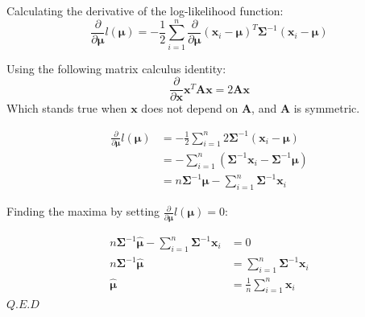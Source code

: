 \documentclass{homeworg}
\begin{document}
\bigskip
Calculating the derivative of the log-likelihood function:
\begin{equation}
    \frac{\partial}{\partial \bm{\mu}} l(\bm{\mu}) = - \frac{1}{2}\sum_{i=1}^n \frac{\partial}{\partial \bm{\mu}} (\bm{x}_i-\bm{\mu})^T\bm{\Sigma}^{-1}(\bm{x}_i-\bm{\mu})
\end{equation}

Using the following matrix calculus identity:
\[
    \frac{\partial}{\partial \bm{x}} \bm{x}^T\bm{A}\bm{x} = 2\bm{A}\bm{x}
\]
Which stands true when $\bm{x}$ does not depend on $\bm{A}$, and $\bm{A}$ is symmetric.

\begin{equation}
    \begin{aligned}
        \frac{\partial}{\partial \bm{\mu}} l(\bm{\mu}) &= - \frac{1}{2}\sum_{i=1}^n 2\bm{\Sigma}^{-1}(\bm{x}_i-\bm{\mu})
        \\
        &= -\sum_{i=1}^n \left( \bm{\Sigma}^{-1}\bm{x}_i-\bm{\Sigma}^{-1}\bm{\mu} \right)
        \\
        &= n\bm{\Sigma}^{-1}\bm{\mu} - \sum_{i=1}^n\bm{\Sigma}^{-1}\bm{x}_i
    \end{aligned}
\end{equation}

Finding the maxima by setting $\frac{\partial}{\partial \bm{\mu}} l(\bm{\mu}) = 0$:

\begin{equation}
    \begin{aligned}
        n\bm{\Sigma}^{-1}\bm{\hat{\mu}} - \sum_{i=1}^n\bm{\Sigma}^{-1}\bm{x}_i &= 0
        \\
        n\bm{\Sigma}^{-1}\bm{\hat{\mu}} &= \sum_{i=1}^n\bm{\Sigma}^{-1}\bm{x}_i
        \\
        \bm{\hat{\mu}} &= \frac{1}{n}\sum_{i=1}^n\bm{x}_i
    \end{aligned}
\end{equation}
$Q.E.D$
\end{document}
